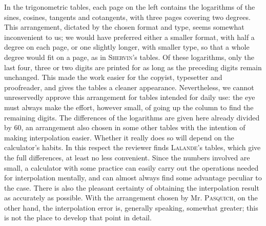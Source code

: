In the trigonometric tables, each page on the left contains the logarithms of the sines, cosines, tangents and cotangents, with three pages covering two degrees. This arrangement, dictated by the chosen format and type, seems somewhat inconvenient to us; 
we would have preferred either a smaller format, with half a degree on each page, or one slightly longer, with smaller type, so that a whole degree would fit on a page, as in \textsc{Shervin}'s tables. Of these logarithms, only the last four, three or two digits are printed for as long as the preceding digits remain unchanged. This made the work easier for the copyist, typesetter and proofreader, and gives the tables a cleaner appearance. Nevertheless, we cannot unreservedly approve this arrangement for tables intended for daily use: the eye must always make the effort, however small, of going up the column to find the remaining digits. The differences of the logarithms are given here already divided by 60, an arrangement also chosen in some other tables with the intention of making interpolation easier. Whether it really does so will depend on the calculator's habits. In this respect the reviewer finds \textsc{Lalande}'s tables, which give the full differences, at least no less convenient. Since the numbers involved are small, a calculator with some practice can easily carry out the operations needed for interpolation mentally, and can almost always find some advantage peculiar to the case. There is also the pleasant certainty of obtaining the interpolation result as accurately as possible. With the arrangement chosen by Mr. \textsc{Pasquich}, on the other hand, the interpolation error is, generally speaking, somewhat greater; this is not the place to develop that point in detail.

